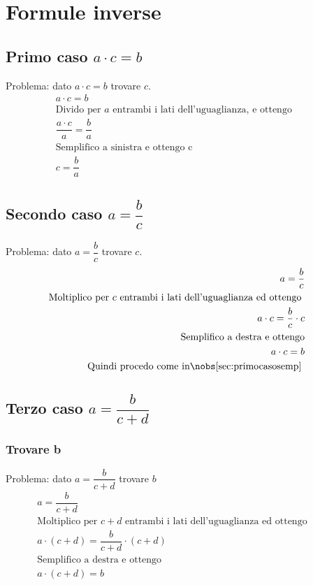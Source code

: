\chapter{Formule inverse}
\label{cha:semplificazioni}
\section[Primo caso]{Primo caso $a\cdot c=b$}
\label{sec:primocasosemp}
Problema: dato $a\cdot c=b$ trovare $c$.
\begin{align*}
a\cdot c=b&&\\
\text{Divido per $a$ entrambi i lati dell'uguaglianza, e ottengo}\\
\dfrac{a\cdot c}{a}=\dfrac{b}{a}&&\\
\text{Semplifico a sinistra e ottengo c}\\
c=\dfrac{b}{a}&&
\end{align*}
\section[Secondo caso]{Secondo caso $a=\dfrac{b}{c}$}
\label{sec:secondocasosemp}
Problema: dato $a=\dfrac{b}{c}$ trovare $c$.
\begin{align*}
a=\dfrac{b}{c}&&\\
\text{Moltiplico per $c$ entrambi i lati dell'uguaglianza ed ottengo }\\
a\cdot c=\dfrac{b}{c}\cdot c&&\\
\text{Semplifico a destra e ottengo}\\
a\cdot c=b&&\\
\text{Quindi procedo come in\nobs\ref{sec:primocasosemp} }
\end{align*}
\section[Terzo caso]{Terzo caso $a=\dfrac{b}{c+d}$}
\label{sec:terzocasosemp}
\subsection{Trovare b}
\label{sec:terzocasosemptrovareb}
Problema: dato $a=\dfrac{b}{c+d}$ trovare $b$
\begin{align*}
a=\dfrac{b}{c+d}&&\\
\text{Moltiplico per $c+d$ entrambi i lati dell'uguaglianza ed ottengo }\\
a\cdot (c+d)=\dfrac{b}{c+d}\cdot(c+d)&&\\
\text{Semplifico a destra e ottengo}\\
a\cdot (c+d)=b&&
\end{align*}
